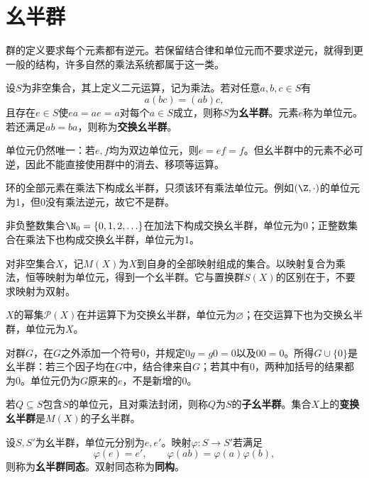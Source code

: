 \section{幺半群}

群的定义要求每个元素都有逆元。若保留结合律和单位元而不要求逆元，就得到更一般的结构，许多自然的乘法系统都属于这一类。

\begin{definition}
设$S$为非空集合，其上定义二元运算，记为乘法。若对任意$a,b,c\in S$有
\[
a(bc)=(ab)c,
\]
且存在$e\in S$使$ea=ae=a$对每个$a\in S$成立，则称$S$为\textbf{幺半群}。元素$e$称为单位元。若还满足$ab=ba$，则称为\textbf{交换幺半群}。
\end{definition}

单位元仍然唯一：若$e,f$均为双边单位元，则$e=ef=f$。但幺半群中的元素不必可逆，因此不能直接使用群中的消去、移项等运算。

\begin{example}
环的全部元素在乘法下构成幺半群，只须该环有乘法单位元。例如$(\Z,\cdot)$的单位元为1，但0没有乘法逆元，故它不是群。

非负整数集合$\N_0=\{0,1,2,\ldots\}$在加法下构成交换幺半群，单位元为0；正整数集合在乘法下也构成交换幺半群，单位元为1。
\end{example}

\begin{example}
对非空集合$X$，记$M(X)$为$X$到自身的全部映射组成的集合。以映射复合为乘法，恒等映射为单位元，得到一个幺半群。它与置换群$S(X)$的区别在于，不要求映射为双射。

$X$的幂集$\mathcal P(X)$在并运算下为交换幺半群，单位元为$\varnothing$；在交运算下也为交换幺半群，单位元为$X$。
\end{example}

\begin{example}
对群$G$，在$G$之外添加一个符号0，并规定$0g=g0=0$以及$00=0$。所得$G\cup\{0\}$是幺半群：若三个因子均在$G$中，结合律来自$G$；若其中有0，两种加括号的结果都为0。单位元仍为$G$原来的$e$，不是新增的0。
\end{example}

\begin{definition}
若$Q\subseteq S$包含$S$的单位元，且对乘法封闭，则称$Q$为$S$的\textbf{子幺半群}。集合$X$上的\textbf{变换幺半群}是$M(X)$的子幺半群。

设$S,S'$为幺半群，单位元分别为$e,e'$。映射$\varphi:S\to S'$若满足
\[
\varphi(e)=e',\qquad\varphi(ab)=\varphi(a)\varphi(b),
\]
则称为\textbf{幺半群同态}。双射同态称为\textbf{同构}。
\end{definition}

